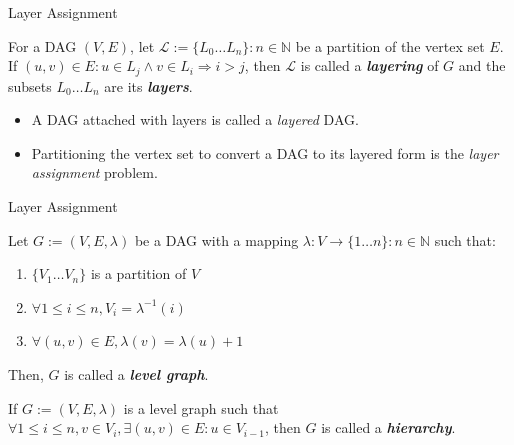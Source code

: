 \documentclass{beamer}
\begin{document}
\begin{frame}{Layer Assignment}
    
    
    \begin{definition}

        For a DAG $(V,E)$, let $\mathcal{L} := \{L_0 \dots L_n\} : n \in \mathbb{N}$ be a partition of the vertex set $E$. If $(u,v) \in E : u \in L_j \land v \in L_i \Rightarrow i > j$, then $\mathcal{L}$ is called a \textbf{\textit{layering}} of $G$ and the subsets $L_0 \dots L_n$ are its \textbf{\textit{layers}}.

    \end{definition}

    \begin{itemize}
        
        \item A DAG attached with layers is called a \textit{layered} DAG.
        \item Partitioning the vertex set to convert a DAG to its layered form is the \textit{layer assignment} problem.

    \end{itemize}


\end{frame}


\begin{frame}{Layer Assignment}
    
    \begin{definition}
        
        Let $G := (V,E,\lambda)$ be a DAG with a mapping $\lambda : V \rightarrow \{1 \dots n\} : n \in \mathbb{N}$ such that:

        \begin{enumerate}
            
            \item $\{V_1 \dots V_n\}$ is a partition of $V$
            \item $\forall 1 \leq i \leq n, V_i = \lambda^{-1}(i)$
            \item $\forall (u,v) \in E, \lambda(v) = \lambda(u) + 1$

        \end{enumerate}

        Then, $G$ is called a \textbf{\textit{level graph}}.

    \end{definition}

    \begin{definition}
        
        If $G := (V,E,\lambda)$ is a level graph such that $\forall 1 \leq i \leq n, v \in V_i, \exists (u,v) \in E : u \in V_{i-1}$, then $G$ is called a \textbf{\textit{hierarchy}}.

    \end{definition}

\end{frame}
\end{document}
